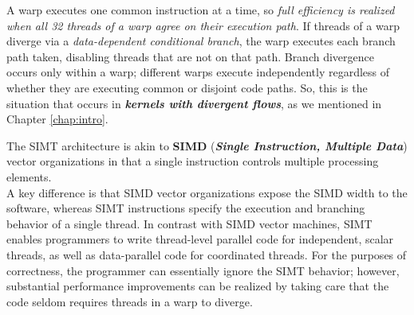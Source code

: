 	A warp executes one common instruction at a time, so \textit{full efficiency is realized when all 32 threads of a warp agree on their execution path}. If threads of a warp diverge via a \textit{data-dependent conditional branch}, the warp executes each branch path taken, disabling threads that are not on that path. Branch divergence occurs only within a warp; different warps execute independently regardless of whether they are executing common or disjoint code paths. So, this is the situation that occurs in \textbf{\textit{kernels with divergent flows}}, as we mentioned in Chapter \ref{chap:intro}.
	
	The SIMT architecture is akin to \textbf{SIMD} (\textbf{\textit{Single Instruction, Multiple Data}}) vector organizations in that a single instruction controls multiple processing elements.\\
	A key difference is that SIMD vector organizations expose the SIMD width to the software, whereas SIMT instructions specify the execution and branching behavior of a single thread. In contrast with SIMD vector machines, SIMT enables programmers to write thread-level parallel code for independent, scalar threads, as well as data-parallel code for coordinated threads. For the purposes of correctness, the programmer can essentially ignore the SIMT behavior; however, substantial performance improvements can be realized by taking care that the code seldom requires threads in a warp to diverge\cite{perfoptimize,understandlatency}. 
